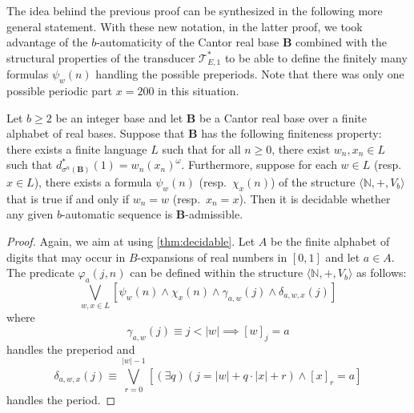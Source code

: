 \documentclass[12pt,reqno]{amsart}
\newcommand{\B}{{\mathbf{B}}}
\begin{document}
The idea behind the previous proof can be synthesized in the following more general statement. With these new notation, in the latter proof, we took advantage of the $b$-automaticity of the Cantor real base $\B$ combined with the structural properties of the transducer $\mathcal{T}_{E,1}^*$ to be able to define the finitely many formulas $\psi_w(n)$ handling the possible preperiods. Note that there was only one possible periodic part $x=200$ in this situation.


\begin{proposition}
\label{pro:finprop}
    Let $b\ge 2$ be an integer base and let $\B$ be a Cantor real base over a finite alphabet of real bases.  
    Suppose that $\B$ has the following finiteness property: there exists a finite language $L$ such that for all $n\ge 0$, there exist $w_n,x_n\in L$ such that $d_{\sigma^n(\B)}^*(1)=w_n(x_n)^\omega$. 
    Furthermore, suppose %
    for each $w\in L$ (resp.\ $x\in L$), there exists a formula $\psi_w(n)$ (resp.\ $\chi_x(n)$) of the structure $\langle \mathbb{N},+,V_b\rangle$ that is true if and only if $w_n=w$ (resp.\ $x_n=x$).
    Then it is decidable whether any given $b$-automatic sequence is $\B$-admissible.
\end{proposition}

\begin{proof}
    Again, we aim at using \cref{thm:decidable}. Let $A$ be the finite alphabet of digits that may occur in $B$-expansions of real numbers in $[0,1]$ and let $a\in A$. The predicate $\varphi_a(j,n)$ can be defined within the structure $\langle \mathbb{N},+,V_b\rangle$ as follows:
    \[
        \bigvee_{w,x\in L} [\psi_w(n)\wedge \chi_x(n)\wedge \gamma_{a,w}(j)\wedge \delta_{a,w,x}(j)]
    \]
    where 
    \[
        \gamma_{a,w}(j)\equiv j<|w| \implies [w]_j=a
    \]
    handles the preperiod 
    and 
    \[
        \delta_{a,w,x}(j)\equiv \bigvee_{r=0}^{|w|-1} [(\exists q)(j=|w|+q\cdot|x|+r)\wedge [x]_r=a]
    \]
    handles the period.
\end{proof}



\end{document}
